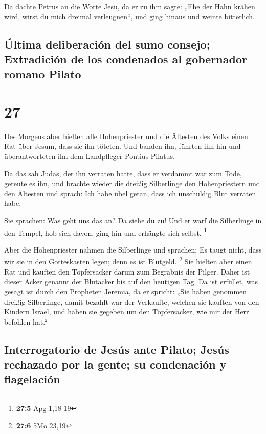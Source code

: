  Da dachte Petrus an die Worte Jesu, da er zu ihm sagte:
„Ehe der Hahn krähen wird, wirst du mich dreimal verleugnen``, und ging
hinaus und weinte bitterlich.

\hypertarget{uxfaltima-deliberaciuxf3n-del-sumo-consejo-extradiciuxf3n-de-los-condenados-al-gobernador-romano-pilato}{%
\subsection{Última deliberación del sumo consejo; Extradición de los
condenados al gobernador romano
Pilato}\label{uxfaltima-deliberaciuxf3n-del-sumo-consejo-extradiciuxf3n-de-los-condenados-al-gobernador-romano-pilato}}

\hypertarget{section-26}{%
\section{27}\label{section-26}}

 Des Morgens aber hielten alle Hohenpriester und die
Ältesten des Volks einen Rat über Jesum, dass sie ihn töteten.
 Und banden ihn, führten ihn hin und überantworteten ihn
dem Landpfleger Pontius Pilatus.

 Da das sah Judas, der ihn verraten hatte, dass er
verdammt war zum Tode, gereute es ihn, und brachte wieder die dreißig
Silberlinge den Hohenpriestern und den Ältesten  und
sprach: Ich habe übel getan, dass ich unschuldig Blut verraten habe.

 Sie sprachen: Was geht uns das an? Da siehe du zu! Und er
warf die Silberlinge in den Tempel, hob sich davon, ging hin und
erhängte sich selbst. \footnote{\textbf{27:5} Apg 1,18-19}

 Aber die Hohenpriester nahmen die Silberlinge und
sprachen: Es taugt nicht, dass wir sie in den Gotteskasten legen; denn
es ist Blutgeld. \footnote{\textbf{27:6} 5Mo 23,19}  Sie
hielten aber einen Rat und kauften den Töpfersacker darum zum Begräbnis
der Pilger.  Daher ist dieser Acker genannt der Blutacker
bis auf den heutigen Tag.  Da ist erfüllet, was gesagt ist
durch den Propheten Jeremia, da er spricht: „Sie haben genommen dreißig
Silberlinge, damit bezahlt war der Verkaufte, welchen sie kauften von
den Kindern Israel,  und haben sie gegeben um den
Töpfersacker, wie mir der Herr befohlen hat.``

\hypertarget{interrogatorio-de-jesuxfas-ante-pilato-jesuxfas-rechazado-por-la-gente-su-condenaciuxf3n-y-flagelaciuxf3n}{%
\subsection{Interrogatorio de Jesús ante Pilato; Jesús rechazado por la
gente; su condenación y
flagelación}\label{interrogatorio-de-jesuxfas-ante-pilato-jesuxfas-rechazado-por-la-gente-su-condenaciuxf3n-y-flagelaciuxf3n}}

